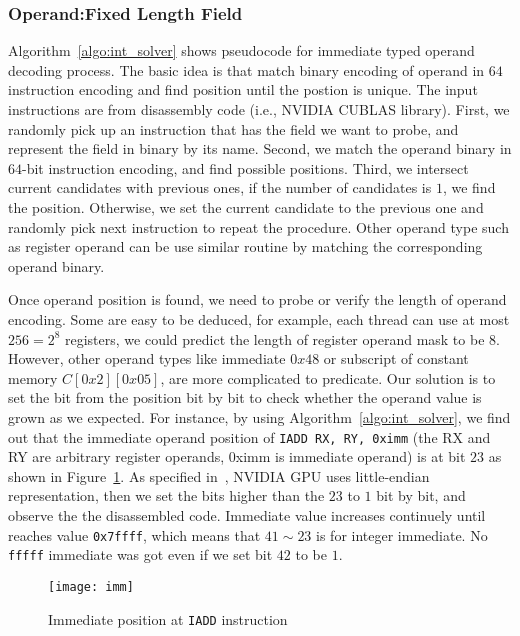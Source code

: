 \subsubsection{Operand:Fixed Length Field}
Algorithm~\ref{algo:int_solver} shows pseudocode for immediate typed operand decoding process. 
The basic idea is that match binary encoding of operand in $64$ instruction encoding and find
position until the postion is unique. The input instructions are from disassembly code (i.e., NVIDIA CUBLAS library).
First, we randomly pick up an instruction that has the field we want to probe, and represent the field in binary by its name. Second, we match the operand binary in $64$-bit instruction encoding, and find possible positions. Third, we intersect current candidates with previous ones, if the number of candidates is $1$, we find the position. Otherwise, we set the current candidate to the previous one and randomly pick next instruction to repeat the procedure.
Other operand type such as register operand can be use similar routine by matching the corresponding operand binary.

Once operand position is found, we need to probe or verify the length of operand encoding. Some are easy to be
deduced, for example, each thread can use at most $256=2^{8}$ registers, we could predict the length of register operand mask to be $8$.
However, other operand types like immediate $0x48$ or subscript of constant memory $C[0x2][0x05]$, are more complicated to predicate. Our solution is to set the bit from the position bit by bit to check whether the operand value is grown as we expected. For instance, by using Algorithm~\ref{algo:int_solver}, we find out that the immediate operand position of {\tt IADD RX, RY, 0ximm} (the RX and RY are arbitrary register operands, 0ximm is immediate operand) is at bit $23$ as shown in Figure~\ref{fig:imm}. As specified in~\cite{cuda2015programming}, NVIDIA GPU uses little-endian representation, then we set the bits higher than the $23$ to $1$ bit by bit, and observe the the disassembled code. Immediate value increases continuely until reaches value {\tt 0x7ffff}, which means that $41\sim23$ is for integer immediate. No {\tt fffff} immediate was got even if we set bit $42$ to be $1$.  

\begin{figure}[htbp]
\begin{center}
\texttt{[image: imm]}
    \caption{Immediate position at {\tt IADD} instruction}
\label{fig:imm}
\end{center}
\end{figure}

